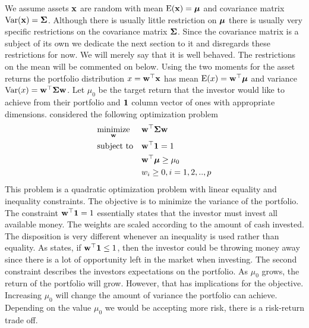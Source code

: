 \documentclass[]{book}\usepackage{knitr}
\begin{document}
We assume assets $\mathbf{x}$ are random with mean $\operatorname{E}(\mathbf{x})=\mbox{\boldmath$\mu$}$ and covariance matrix $\operatorname{Var}(\mathbf{x})=\mathbf{\Sigma}$. Although there is usually little restriction on $\mbox{\boldmath$\mu$}$ there is usually very specific restrictions on the covariance matrix $\mathbf{\Sigma}$. Since the covariance matrix is a subject of its own we dedicate the next section to it and disregards these restrictions for now. We will merely say that it is well behaved. The restrictions on the mean will be commented on below. Using the two moments for the asset returns the portfolio distribution $x = \mathbf{w}^\top \mathbf{x}$ has mean $\operatorname{E}(x)=\mathbf{w}^\top \mbox{\boldmath$\mu$}$ and variance $\operatorname{Var}(x)=\mathbf{w}^\top \mathbf{\Sigma} \mathbf{w}$. Let $\mu_0$ be the target return that the investor would like to achieve from their portfolio and $\mathbf{1}$ column vector of ones with appropriate dimensions. \textcite{markowitz1959portfolio} considered the following optimization problem
\begin{equation}\label{eqn:markowitz_optim}
\begin{aligned}
& \underset{\mathbf{w}}{\text{minimize}} 
& & \mathbf{w}^\top \mathbf{\Sigma} \mathbf{w} \\
& \text{subject to}
& & \mathbf{w}^\top \mathbf{1} = 1 \\
& && \mathbf{w}^\top \mbox{\boldmath$\mu$} \geq \mu_0 \\
&&& w_i \geq 0, i=1,2,..,p
\end{aligned}
\end{equation}
This problem is a quadratic optimization problem with linear equality and inequality constraints. 
The objective is to minimize the variance of the portfolio. 
The constraint $\mathbf{w}^\top \mathbf{1} = 1$ essentially states that the investor must invest all available money. 
The weights are scaled according to the amount of cash invested.
The disposition is very different whenever an inequality is used rather than equality. 
As \textcite{hult2012risk} states, if $\mathbf{w}^\top \mathbf{1} \leq 1$, then the investor could be throwing money away since there is a lot of opportunity left in the market when investing.
The second constraint describes the investors expectations on the portfolio. 
As $\mu_0$ grows, the return of the portfolio will grow. 
However, that has implications for the objective. 
Increasing $\mu_0$ will change the amount of variance the portfolio can achieve. 
Depending on the value $\mu_0$ we would be accepting more risk, there is a risk-return trade off. 
\end{document}
